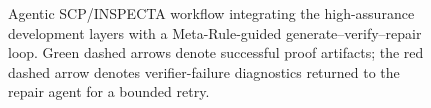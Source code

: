 \documentclass[conference]{IEEEtran}
\begin{document}




\begin{figure}[!t]
\centering
\resizebox{0.96\textwidth}{!}{}
\caption{Agentic SCP/INSPECTA workflow integrating the high-assurance development layers with a Meta-Rule-guided generate--verify--repair loop. Green dashed arrows denote successful proof artifacts; the red dashed arrow denotes verifier-failure diagnostics returned to the repair agent for a bounded retry.}
\label{fig:agentic-inspecta}
\vspace{-0.4em}
\end{figure}
\end{document}
